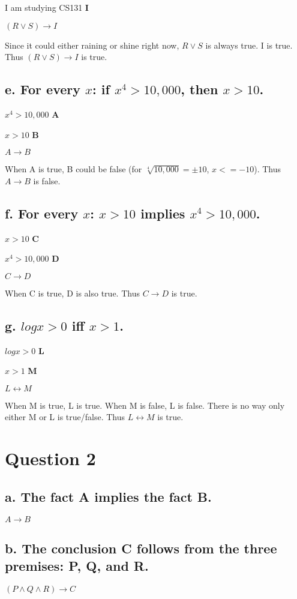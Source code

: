 \documentclass{article}
\begin{document}
I am studying CS131 \textbf{I}

$(R \lor S) \rightarrow I$

Since it could either raining or shine right now, $R \lor S$ is always true. I is true. Thus $(R \lor S) \rightarrow I$ is true. 

\subsection*{e. For every $x$: if $x^4>10,000$, then $x>10$.}

$x^4>10,000$ \textbf{A}

$x>10$ \textbf{B}

$A \rightarrow B$

When A is true, B could be false (for $\sqrt[4]{10,000} = \pm 10$, $x <= -10$). Thus $A \rightarrow B$ is false.

\subsection*{f. For every $x$: $x>10$ implies $x^4 > 10,000$.}

$x>10$ \textbf{C}

$x^4>10,000$ \textbf{D}

$C \rightarrow D$

When C is true, D is also true. Thus $C \rightarrow D$ is true.

\subsection*{g. $log x>0$ iff $x>1$.}

$log x>0$ \textbf{L}

$x>1$ \textbf{M}

$L \leftrightarrow M$

When M is true, L is true. When M is false, L is false. There is no way only either M or L is true/false. Thus $L \leftrightarrow M$ is true.

\section*{Question 2}
\subsection*{a. The fact A implies the fact B.}
$A \rightarrow B$
\subsection*{b. The conclusion C follows from the three premises: P, Q, and R.}
$(P \land Q \land R) \rightarrow C$
\end{document}

